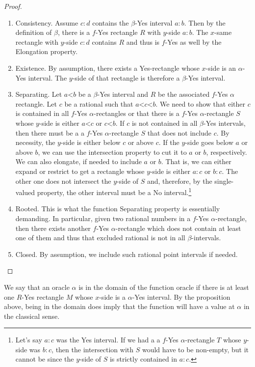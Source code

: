 \documentclass[12pt]{article}
\theoremstyle{remark}
\newcommand{\lt}{\mathord{<}}
\begin{document}
\begin{proof}
\begin{enumerate}
    \item Consistency. Assume $c:d$ contains the $\beta$-Yes interval $a:b$. Then by the definition of $\beta$, there is a $f$-Yes rectangle $R$ with $y$-side $a:b$. The $x$-same rectangle with $y$-side $c:d$ contains $R$ and thus is $f$-Yes as well by the Elongation property. 
    \item Existence. By assumption, there exists a Yes-rectangle whose $x$-side is an $\alpha$-Yes interval. The $y$-side of that rectangle is therefore a $\beta$-Yes interval. 
    \item Separating. Let $a \lt b$ be a $\beta$-Yes interval and $R$ be the associated $f$-Yes $\alpha$ rectangle. Let $c$ be a rational such that $a \lt c \lt b$. We need to show that either $c$ is contained in all $f$-Yes $\alpha$-rectangles or that there is a $f$-Yes $\alpha$-rectangle $S$ whose $y$-side is either $a \lt c$ or $c \lt b$. If $c$ is not contained in all $\beta$-Yes intervals, then there must be a a $f$-Yes $\alpha$-rectangle $S$ that does not include $c$. By necessity, the $y$-side is either below $c$ or above $c$. If the $y$-side goes below $a$ or above $b$, we can use the intersection property to cut it to $a$ or $b$, respectively. We can also elongate, if needed to include $a$ or $b$.  That is, we can either expand or restrict to get a rectangle whose $y$-side is either $a:c$ or  $b:c$. The other one does not intersect the $y$-side of $S$ and, therefore, by the single-valued property, the other interval must be a No interval.\footnote{Let's say $a:c$ was the Yes interval. If we had a a $f$-Yes $\alpha$-rectangle $T$ whose $y$-side was $b:c$, then the intersection with $S$ would have to be non-empty, but it cannot be since the $y$-side of $S$ is strictly contained in $a:c$.  }  
    \item Rooted. This is what the function Separating property is essentially demanding. In particular, given two rational numbers in a $f$-Yes $\alpha$-rectangle, then there exists another $f$-Yes $\alpha$-rectangle which does not contain at least one of them and thus that excluded rational is not in all $\beta$-intervals. 
    \item Closed. By assumption, we include such rational point intervals if needed.  
\end{enumerate}

\end{proof}


We say that an oracle $\alpha$ is in the domain of the function oracle if there is at least one $R$-Yes rectangle $M$ whose $x$-side is a $\alpha$-Yes interval. By the proposition above, being in the domain does imply that the function will have a value at $\alpha$ in the classical sense. 
\end{document}
